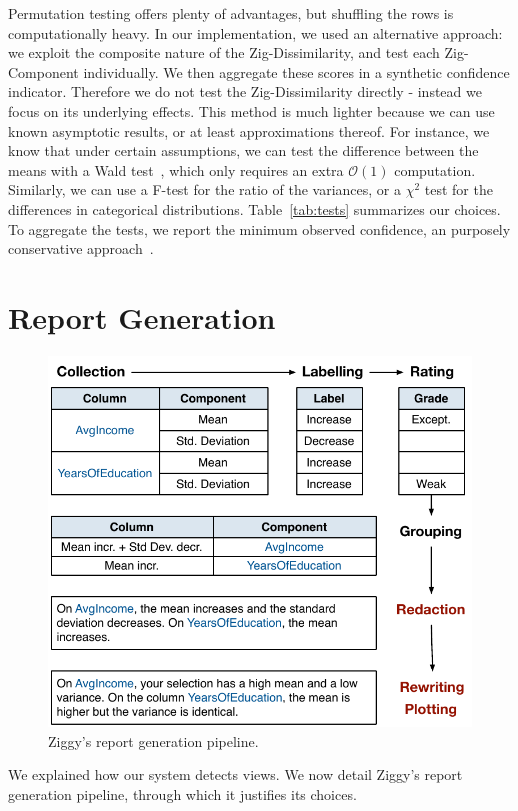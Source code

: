 Permutation testing offers plenty of advantages, but shuffling the rows is
computationally heavy. In our implementation, we used an alternative approach:
we exploit the composite nature of the Zig-Dissimilarity, and test
each Zig-Component individually. We then aggregate these scores in a synthetic
confidence indicator. Therefore we do not test the Zig-Dissimilarity directly -
instead we focus on its underlying effects.  This method is much lighter
because we can use known asymptotic results, or at least approximations
thereof. For instance, we know that under certain assumptions, we can test the
difference between the means with a Wald test~\cite{wasserman2013all}, which
only requires an extra $\mathcal{O}(1)$ computation.  Similarly, we can use a
F-test for the ratio of the variances, or a $\chi^2$ test for the differences
in categorical distributions.  Table~\ref{tab:tests} summarizes our choices. 
To aggregate the tests, we report the minimum observed confidence, an purposely
conservative approach~\cite{wasserman2013all}.

\section{Report Generation}
\label{sec:reporting}
\begin{figure}[t!]
  \centering
  \includegraphics[width=\columnwidth]{Figures/ReportGeneration}
  \caption{Ziggy's report generation pipeline.}
  \label{pic:reportpipeline}
\end{figure}
We explained how our system detects views. We now detail Ziggy's report generation
pipeline, through which it justifies its choices. 


